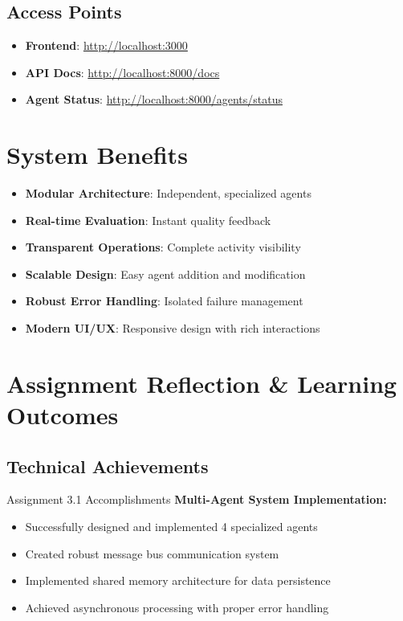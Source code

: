 \documentclass[12pt,a4paper]{article}
\begin{document}
\subsection{Access Points}
\begin{itemize}
    \item \textbf{Frontend}: \url{http://localhost:3000}
    \item \textbf{API Docs}: \url{http://localhost:8000/docs}
    \item \textbf{Agent Status}: \url{http://localhost:8000/agents/status}
\end{itemize}

\section{System Benefits}

\begin{multicols}{2}
\begin{itemize}
    \item[\textcolor{secondarygreen}{\checkmark}] \textbf{Modular Architecture}: Independent, specialized agents
    \item[\textcolor{secondarygreen}{\checkmark}] \textbf{Real-time Evaluation}: Instant quality feedback
    \item[\textcolor{secondarygreen}{\checkmark}] \textbf{Transparent Operations}: Complete activity visibility
    \item[\textcolor{secondarygreen}{\checkmark}] \textbf{Scalable Design}: Easy agent addition and modification
    \item[\textcolor{secondarygreen}{\checkmark}] \textbf{Robust Error Handling}: Isolated failure management
    \item[\textcolor{secondarygreen}{\checkmark}] \textbf{Modern UI/UX}: Responsive design with rich interactions
\end{itemize}
\end{multicols}

\section{Assignment Reflection \& Learning Outcomes}

\subsection{Technical Achievements}

\begin{infobox}{Assignment 3.1 Accomplishments}
\textbf{Multi-Agent System Implementation:}
\begin{itemize}
    \item Successfully designed and implemented 4 specialized agents
    \item Created robust message bus communication system
    \item Implemented shared memory architecture for data persistence
    \item Achieved asynchronous processing with proper error handling
\end{itemize}
\end{infobox}
\end{document}
